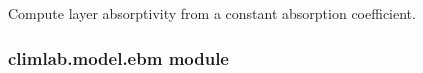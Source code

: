 \documentclass[letterpaper,10pt,english]{sphinxmanual}
\begin{document}

\begin{fulllineitems}
\label{api/climlab.model:climlab.model.column.compute_layer_absorptivity}
Compute layer absorptivity from a constant absorption coefficient.

\end{fulllineitems}



\subsubsection{climlab.model.ebm module}
\label{api/climlab.model:climlab-model-ebm-module}\label{api/climlab.model:module-climlab.model.ebm}
\end{document}
